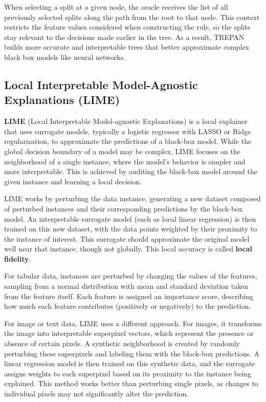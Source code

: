 When selecting a split at a given node, the oracle receives the list of all previously selected splits along the path from the root to that node. This context restricts the feature values considered when constructing the rule, so the splits stay relevant to the decisions made earlier in the tree. As a result, TREPAN builds more accurate and interpretable trees that better approximate complex black box models like neural networks.
\subsection{Local Interpretable Model-Agnostic Explanations (LIME)}
\textbf{LIME} (Local Interpretable Model-agnostic Explanations) is a local explainer that uses surrogate models, typically a logistic regressor with LASSO or Ridge regularization, to approximate the predictions of a black-box model. While the global decision boundary of a model may be complex, LIME focuses on the neighborhood of a single instance, where the model's behavior is simpler and more interpretable. This is achieved by auditing the black-box model around the given instance and learning a local decision.

LIME works by perturbing the data instance, generating a new dataset composed of perturbed instances and their corresponding predictions by the black-box model. An interpretable surrogate model (such as local linear regression) is then trained on this new dataset, with the data points weighted by their proximity to the instance of interest. This surrogate should approximate the original model well near that instance, though not globally. This local accuracy is called \textbf{local fidelity}.

For tabular data, instances are perturbed by changing the values of the features, sampling from a normal distribution with mean and standard deviation taken from the feature itself. Each feature is assigned an importance score, describing how much each feature contributes (positively or negatively) to the prediction.

For image or text data, LIME uses a different approach. For images, it transforms the image into interpretable superpixel vectors, which represent the presence or absence of certain pixels. A synthetic neighborhood is created by randomly perturbing these superpixels and labeling them with the black-box predictions. A linear regression model is then trained on this synthetic data, and the surrogate assigns weights to each superpixel based on its proximity to the instance being explained. This method works better than perturbing single pixels, as changes to individual pixels may not significantly alter the prediction.

